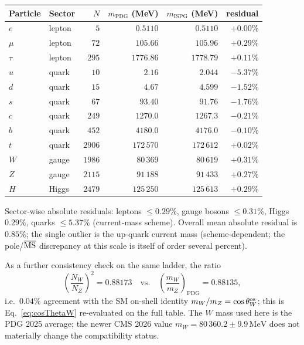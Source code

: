\documentclass[11pt]{article}
\begin{document}
\begin{center}
\begin{tabular}{llrrrr}
\toprule
Particle & Sector & $N$ &
 $m_{\text{PDG}}$ (MeV) & $m_{\text{ISPG}}$ (MeV) & residual \\
\midrule
$e$       & lepton &    $5$ &      $0.5110$ &      $0.5110$ & $+0.00\%$ \\
$\mu$     & lepton &   $72$ &    $105.66$   &    $105.96$   & $+0.29\%$ \\
$\tau$    & lepton &  $295$ &   $1776.86$   &   $1778.79$   & $+0.11\%$ \\
$u$       & quark  &   $10$ &      $2.16$   &      $2.044$  & $-5.37\%$ \\
$d$       & quark  &   $15$ &      $4.67$   &      $4.599$  & $-1.52\%$ \\
$s$       & quark  &   $67$ &     $93.40$   &     $91.76$   & $-1.76\%$ \\
$c$       & quark  &  $249$ &   $1270.0$    &   $1267.3$    & $-0.21\%$ \\
$b$       & quark  &  $452$ &   $4180.0$    &   $4176.0$    & $-0.10\%$ \\
$t$       & quark  & $2906$ & $172\,570$    & $172\,612$    & $+0.02\%$ \\
$W$       & gauge  & $1986$ &  $80\,369$    &  $80\,619$    & $+0.31\%$ \\
$Z$       & gauge  & $2115$ &  $91\,188$    &  $91\,433$    & $+0.27\%$ \\
$H$       & Higgs  & $2479$ & $125\,250$    & $125\,613$    & $+0.29\%$ \\
\bottomrule
\end{tabular}
\end{center}

Sector-wise absolute residuals: leptons $\leq 0.29\%$, gauge
bosons $\leq 0.31\%$, Higgs $0.29\%$, quarks $\leq 5.37\%$
(current-mass scheme). Overall mean absolute residual is
$0.85\%$; the single outlier is the up-quark current mass
(scheme-dependent; the pole/$\overline{\rm MS}$ discrepancy
at this scale is itself of order several percent).

As a further consistency check on the same ladder, the ratio
\[
  \left(\frac{N_W}{N_Z}\right)^{\!2}=0.88173
  \quad\text{vs.}\quad
  \left(\frac{m_W}{m_Z}\right)_{\text{PDG}}=0.88135,
\]
i.e.\ $0.04\%$ agreement with the SM on-shell identity
$m_W/m_Z=\cos\theta_W^{\rm os}$; this is
Eq.~\eqref{eq:cosThetaW} re-evaluated on the full table. The
$W$ mass used here is the PDG 2025 average; the newer CMS 2026
value $m_W=80\,360.2\pm 9.9\,\mathrm{MeV}$ does not materially
change the compatibility status.
\end{document}

